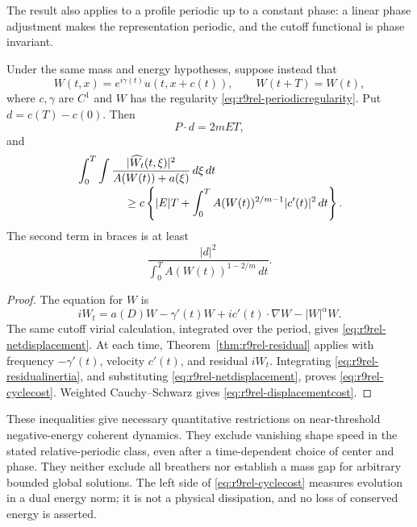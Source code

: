 The result also applies to a profile periodic up to a constant
phase: a linear phase adjustment makes the representation periodic,
and the cutoff functional is phase invariant.

\begin{corollary}
\label{cor:r9rel-movingcenter}
Under the same mass and energy hypotheses, suppose instead that
\[
 W(t,x)=e^{i\gamma(t)}u(t,x+c(t)),\qquad W(t+T)=W(t),
\]
where $c,\gamma$ are $C^1$ and $W$ has the regularity
\eqref{eq:r9rel-periodicregularity}.
Put $d=c(T)-c(0)$. Then
\begin{equation}\label{eq:r9rel-netdisplacement}
 P\cdot d=2mET,
\end{equation}
and
\begin{align}
 &\int_0^T\int
 \frac{|\widehat{W_t}(t,\xi)|^2}{A(W(t))+a(\xi)}\,d\xi\,dt
 \notag\\[-2pt]
 &\hspace{15mm}\ge
 c\left\{|E|T+
 \int_0^T A(W(t))^{2/m-1}|c'(t)|^2\,dt\right\}.
 \label{eq:r9rel-cyclecost}
\end{align}
The second term in braces is at least
\begin{equation}\label{eq:r9rel-displacementcost}
 \frac{|d|^2}{\displaystyle\int_0^T A(W(t))^{1-2/m}\,dt}.
\end{equation}
\end{corollary}
\begin{proof}
The equation for $W$ is
\[
 iW_t=a(D)W-\gamma'(t)W+ic'(t)\cdot\nabla W-|W|^\alpha W.
\]
The same cutoff virial calculation, integrated over the period,
gives \eqref{eq:r9rel-netdisplacement}.
At each time, Theorem~\ref{thm:r9rel-residual} applies with
frequency $-\gamma'(t)$, velocity $c'(t)$, and residual $iW_t$.
Integrating \eqref{eq:r9rel-residualinertia}, and substituting
\eqref{eq:r9rel-netdisplacement}, proves
\eqref{eq:r9rel-cyclecost}. Weighted Cauchy--Schwarz gives
\eqref{eq:r9rel-displacementcost}.
\end{proof}

These inequalities give necessary quantitative restrictions on
near-threshold negative-energy coherent dynamics. They exclude
vanishing shape speed in the stated relative-periodic class, even
after a time-dependent choice of center and phase. They neither
exclude all breathers nor establish a mass gap for arbitrary bounded
global solutions. The left side of \eqref{eq:r9rel-cyclecost} measures
evolution in a dual energy norm; it is not a physical dissipation,
and no loss of conserved energy is asserted.
